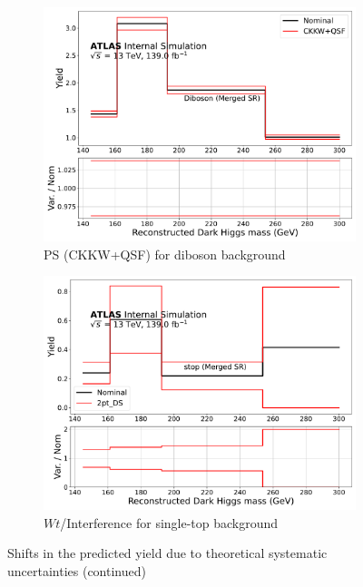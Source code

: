 \begin{figure}
  \begin{subfigure}{0.45\textwidth}
    \includegraphics[width=\textwidth]{Figures/6/ckkw_plus_qsf_syst_Diboson_SR_mgd_TARJets10_minmS_mgd_yield.pdf}
    \caption{PS (CKKW+QSF) for diboson background}
    \label{fig:diboson_PS}
  \end{subfigure} \hspace{1em}
  \begin{subfigure}{0.45\textwidth}
    \includegraphics[width=\textwidth]{Figures/6/2pt_DS_syst_stop_SR_mgd_TARJets10_minmS_mgd_yield.pdf}
    \caption{\(Wt\)/\ttbar Interference for single-top background}
    \label{fig:stop_DS}
  \end{subfigure}
  \caption{Shifts in the predicted yield due to theoretical systematic uncertainties (continued) }
\end{figure}

